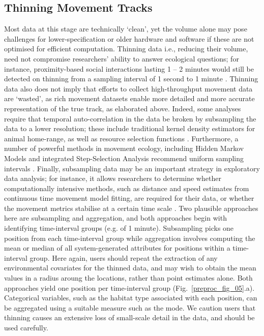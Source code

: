     \subsection*{Thinning Movement Tracks}

    Most data at this stage are technically ‘clean', yet the volume alone may pose challenges for lower-specification or older hardware and software if these are not optimised for efficient computation.
    Thinning data i.e., reducing their volume, need not compromise researchers' ability to answer ecological questions; for instance, proximity-based social interactions lasting 1 -- 2 minutes would still be detected on thinning from a sampling interval of 1 second to 1 minute \citep[][]{aspillaga2021a}.
    Thinning data also does not imply that efforts to collect high-throughput movement data are ‘wasted', as rich movement datasets enable more detailed and more accurate representation of the true track, as elaborated above. 
    Indeed, some analyses require that temporal auto-correlation in the data be broken by subsampling the data to a lower resolution; these include traditional kernel density estimators for animal home-range, as well as resource selection functions \citep{fleming2014,manly2007,dupke2017}.
    Furthermore, a number of powerful methods in movement ecology, including Hidden Markov Models and integrated Step-Selection Analysis recommend uniform sampling intervals \citep{avgar2016,langrock2012,michelot2016}.
    Finally, subsampling data may be an important strategy in exploratory data analysis; for instance, it allows researchers to determine whether computationally intensive methods, such as distance and speed estimates from continuous time movement model fitting, are required for their data, or whether the movement metrics stabilise at a certain time scale \citep[][]{noonan2019}.
    Two plausible approaches here are subsampling and aggregation, and both approaches begin with identifying time-interval groups (e.g. of 1 minute).
    Subsampling picks one position from each time-interval group while aggregation involves computing the mean or median of all system-generated attributes for positions within a time-interval group.
    Here again, users should repeat the extraction of any environmental covariates for the thinned data, and may wish to obtain the mean values in a radius aroung the locations, rather than point estimates alone.
    Both approaches yield one position per time-interval group (Fig.~\ref{preproc_fig_05}.a).
    Categorical variables, such as the habitat type associated with each position, can be aggregated using a suitable measure such as the mode.
    We caution users that thinning causes an extensive loss of small-scale detail in the data, and should be used carefully.

